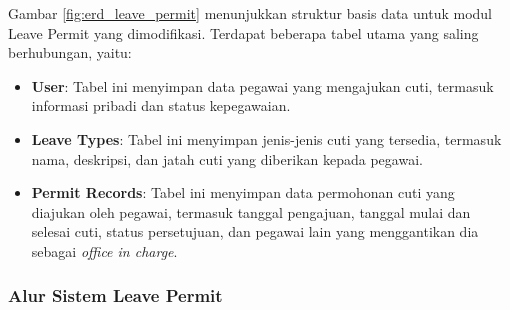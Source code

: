 Gambar \ref{fig:erd_leave_permit} menunjukkan struktur basis data untuk modul Leave Permit yang dimodifikasi. Terdapat beberapa tabel utama yang saling berhubungan, yaitu:
\begin{itemize}
    \item \textbf{User}: Tabel ini menyimpan data pegawai yang mengajukan cuti, termasuk informasi pribadi dan status kepegawaian.
    \item \textbf{Leave Types}: Tabel ini menyimpan jenis-jenis cuti yang tersedia, termasuk nama, deskripsi, dan jatah cuti yang diberikan kepada pegawai.
    \item \textbf{Permit Records}: Tabel ini menyimpan data permohonan cuti yang diajukan oleh pegawai, termasuk tanggal pengajuan, tanggal mulai dan selesai cuti, status persetujuan, dan pegawai lain yang menggantikan dia sebagai \textit{office in charge}.
\end{itemize}


\subsubsection{Alur Sistem Leave Permit}

